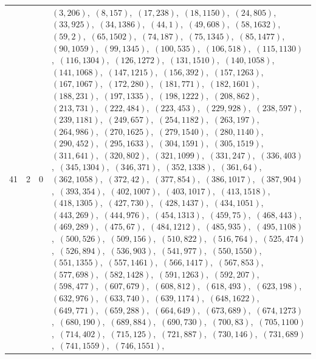 \documentclass[11pt]{article}
\begin{document}
\begin{longtable}{@{}rrl>{\raggedright\arraybackslash}p{}@{}}
41 & 2 & $0$ & $(3,206)$,\allowbreak\ $(8,157)$,\allowbreak\ $(17,238)$,\allowbreak\ $(18,1150)$,\allowbreak\ $(24,805)$,\allowbreak\ $(33,925)$,\allowbreak\ $(34,1386)$,\allowbreak\ $(44,1)$,\allowbreak\ $(49,608)$,\allowbreak\ $(58,1632)$,\allowbreak\ $(59,2)$,\allowbreak\ $(65,1502)$,\allowbreak\ $(74,187)$,\allowbreak\ $(75,1345)$,\allowbreak\ $(85,1477)$,\allowbreak\ $(90,1059)$,\allowbreak\ $(99,1345)$,\allowbreak\ $(100,535)$,\allowbreak\ $(106,518)$,\allowbreak\ $(115,1130)$,\allowbreak\ $(116,1304)$,\allowbreak\ $(126,1272)$,\allowbreak\ $(131,1510)$,\allowbreak\ $(140,1058)$,\allowbreak\ $(141,1068)$,\allowbreak\ $(147,1215)$,\allowbreak\ $(156,392)$,\allowbreak\ $(157,1263)$,\allowbreak\ $(167,1067)$,\allowbreak\ $(172,280)$,\allowbreak\ $(181,771)$,\allowbreak\ $(182,1601)$,\allowbreak\ $(188,231)$,\allowbreak\ $(197,1335)$,\allowbreak\ $(198,1222)$,\allowbreak\ $(208,862)$,\allowbreak\ $(213,731)$,\allowbreak\ $(222,484)$,\allowbreak\ $(223,453)$,\allowbreak\ $(229,928)$,\allowbreak\ $(238,597)$,\allowbreak\ $(239,1181)$,\allowbreak\ $(249,657)$,\allowbreak\ $(254,1182)$,\allowbreak\ $(263,197)$,\allowbreak\ $(264,986)$,\allowbreak\ $(270,1625)$,\allowbreak\ $(279,1540)$,\allowbreak\ $(280,1140)$,\allowbreak\ $(290,452)$,\allowbreak\ $(295,1633)$,\allowbreak\ $(304,1591)$,\allowbreak\ $(305,1519)$,\allowbreak\ $(311,641)$,\allowbreak\ $(320,802)$,\allowbreak\ $(321,1099)$,\allowbreak\ $(331,247)$,\allowbreak\ $(336,403)$,\allowbreak\ $(345,1304)$,\allowbreak\ $(346,371)$,\allowbreak\ $(352,1338)$,\allowbreak\ $(361,64)$,\allowbreak\ $(362,1058)$,\allowbreak\ $(372,42)$,\allowbreak\ $(377,854)$,\allowbreak\ $(386,1017)$,\allowbreak\ $(387,904)$,\allowbreak\ $(393,354)$,\allowbreak\ $(402,1007)$,\allowbreak\ $(403,1017)$,\allowbreak\ $(413,1518)$,\allowbreak\ $(418,1305)$,\allowbreak\ $(427,730)$,\allowbreak\ $(428,1437)$,\allowbreak\ $(434,1051)$,\allowbreak\ $(443,269)$,\allowbreak\ $(444,976)$,\allowbreak\ $(454,1313)$,\allowbreak\ $(459,75)$,\allowbreak\ $(468,443)$,\allowbreak\ $(469,289)$,\allowbreak\ $(475,67)$,\allowbreak\ $(484,1212)$,\allowbreak\ $(485,935)$,\allowbreak\ $(495,1108)$,\allowbreak\ $(500,526)$,\allowbreak\ $(509,156)$,\allowbreak\ $(510,822)$,\allowbreak\ $(516,764)$,\allowbreak\ $(525,474)$,\allowbreak\ $(526,894)$,\allowbreak\ $(536,903)$,\allowbreak\ $(541,977)$,\allowbreak\ $(550,1550)$,\allowbreak\ $(551,1355)$,\allowbreak\ $(557,1461)$,\allowbreak\ $(566,1417)$,\allowbreak\ $(567,853)$,\allowbreak\ $(577,698)$,\allowbreak\ $(582,1428)$,\allowbreak\ $(591,1263)$,\allowbreak\ $(592,207)$,\allowbreak\ $(598,477)$,\allowbreak\ $(607,679)$,\allowbreak\ $(608,812)$,\allowbreak\ $(618,493)$,\allowbreak\ $(623,198)$,\allowbreak\ $(632,976)$,\allowbreak\ $(633,740)$,\allowbreak\ $(639,1174)$,\allowbreak\ $(648,1622)$,\allowbreak\ $(649,771)$,\allowbreak\ $(659,288)$,\allowbreak\ $(664,649)$,\allowbreak\ $(673,689)$,\allowbreak\ $(674,1273)$,\allowbreak\ $(680,190)$,\allowbreak\ $(689,884)$,\allowbreak\ $(690,730)$,\allowbreak\ $(700,83)$,\allowbreak\ $(705,1100)$,\allowbreak\ $(714,402)$,\allowbreak\ $(715,125)$,\allowbreak\ $(721,887)$,\allowbreak\ $(730,146)$,\allowbreak\ $(731,689)$,\allowbreak\ $(741,1559)$,\allowbreak\ $(746,1551)$,\allowbreak\ 
\end{longtable}
\end{document}
